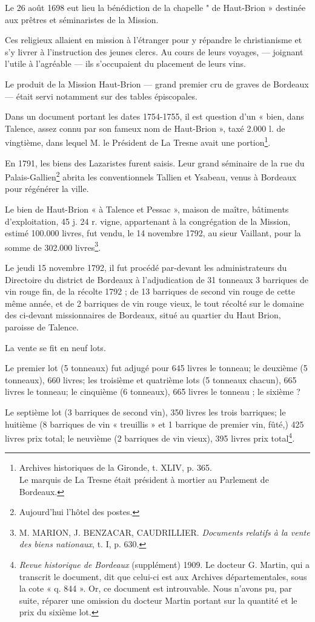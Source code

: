 Le 26 août 1698 eut lieu la bénédiction de la chapelle " de Haut-Brion » destinée aux prêtres et séminaristes de la Mission.

Ces religieux allaient en mission à l'étranger pour y répandre le christianisme et s'y livrer à l'instruction des jeunes clercs. Au cours de leurs voyages, — joignant l'utile à l'agréable — ils s'occupaient du placement de leurs vins.

Le produit de la Mission Haut-Brion — grand premier cru de graves de Bordeaux — était servi notamment sur des tables épiscopales.

Dans un document portant les dates 1754-1755, il est question d'un « bien, dans Talence, assez connu par son fameux nom de Haut-Brion », taxé 2.000 l. de vingtième, dans lequel M. le Président de La Tresne avait une portion\footnote{Archives historiques de la Gironde, t. XLIV, p. 365.\\Le marquis de La Tresne était président à mortier au Parlement de Bordeaux.}.

En 1791, les biens des Lazaristes furent saisis. Leur grand séminaire de la rue du Palais-Gallien\footnote{Aujourd'hui l'hôtel des postes.} abrita les conventionnels Tallien et Ysabeau, venus à Bordeaux pour régénérer la ville.

Le bien de Haut-Brion « à Talence et Pessac », maison de maître, bâtiments d'exploitation, 45 j. 24 r. vigne, appartenant à la congrégation de la Mission, estimé 100.000 livres, fut vendu, le 14 novembre 1792, au sieur Vaillant, pour la somme de 302.000 livres\footnote{M. MARION, J. BENZACAR, CAUDRILLIER. \textit{Documents relatifs à la vente des biens nationaux}, t. I, p. 630.}.

Le jeudi 15 novembre 1792, il fut procédé par-devant les administrateurs du Directoire du district de Bordeaux à l'adjudication de 31 tonneaux 3 barriques de vin rouge fin, de la récolte 1792 ; de 13 barriques de second vin rouge de cette même année, et de 2 barriques de vin rouge vieux, le tout récolté sur le domaine des ci-devant missionnaires de Bordeaux, situé au quartier du Haut Brion, paroisse de Talence.

La vente se fit en neuf lots.

Le premier lot (5 tonneaux) fut adjugé pour 645 livres le tonneau; le deuxième (5 tonneaux), 660 livres; les troisième et quatrième lots (5 tonneaux chacun), 665 livres le tonneau; le cinquième (6 tonneaux), 665 livres le tonneau ; le sixième ?

Le septième lot (3 barriques de second vin), 350 livres les trois barriques; le huitième (8 barriques de vin « treuillis » et 1 barrique de premier vin, fûté,) 425 livres prix total; le neuvième (2 barriques de vin vieux), 395 livres prix total\footnote{\textit{Revue historique de Bordeaux} (supplément) 1909. Le docteur G. Martin, qui a transcrit le document, dit que celui-ci est aux Archives départementales, sous la cote « q. 844 ». Or, ce document est introuvable. Nous n'avons pu, par suite, réparer une omission du docteur Martin portant sur la quantité et le prix du sixième lot.}.

